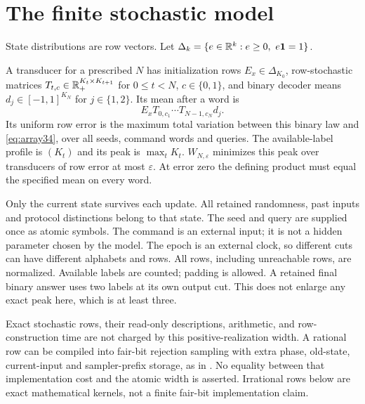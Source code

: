 \section{The finite stochastic model}\label{sec:model34}
State distributions are row vectors. Let
$\Delta_k=\{e\in\mathbb R^k:e\ge0,\ e\mathbf1=1\}$.

\begin{definition}
\label{def:machine34}
A transducer for a prescribed $N$ has initialization rows
$E_x\in\Delta_{K_0}$, row-stochastic matrices
$T_{t,c}\in\mathbb R_+^{K_t\times K_{t+1}}$ for $0\le t<N$, $c\in\{0,1\}$,
and binary decoder means $d_j\in[-1,1]^{K_N}$ for $j\in\{1,2\}$.
Its mean after a word is
\[
 E_xT_{0,c_1}\cdots T_{N-1,c_N}d_j.
\]
Its uniform row error is the maximum total variation between this binary
law and \eqref{eq:array34}, over all seeds, command words and queries.
The available-label profile is $(K_t)$ and its peak is $\max_t K_t$.
$W_{N,\varepsilon}$ minimizes this peak over transducers of row error at
most $\varepsilon$. At error zero the defining product must equal the
specified mean on every word.
\end{definition}

Only the current state survives each update. All retained randomness,
past inputs and protocol distinctions belong to that state. The seed and
query are supplied once as atomic symbols. The command is an external
input; it is not a hidden parameter chosen by the model. The epoch is an
external clock, so different cuts can have different alphabets and rows.
All rows, including unreachable rows, are normalized. Available labels
are counted; padding is allowed. A retained final binary answer uses two
labels at its own output cut. This does not enlarge any exact peak here,
which is at least three.

Exact stochastic rows, their read-only descriptions, arithmetic, and
row-construction time are not charged by this positive-realization width.
A rational row can be compiled into fair-bit rejection sampling with extra
phase, old-state, current-input and sampler-prefix storage, as in
\cite{GTF31}. No equality between that implementation cost and the atomic
width is asserted. Irrational rows below are exact mathematical kernels,
not a finite fair-bit implementation claim.

